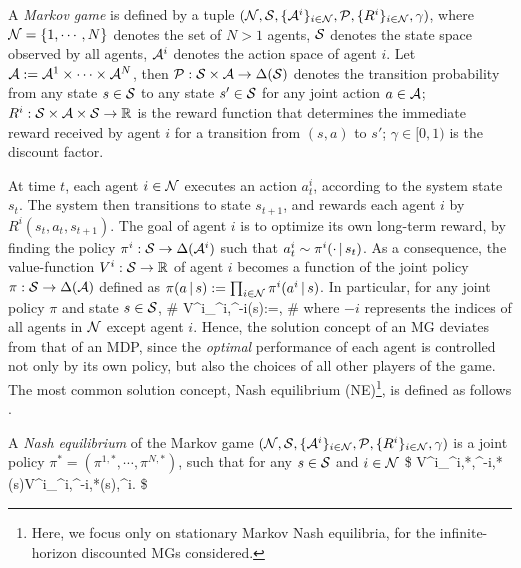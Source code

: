 \begin{definition}\label{def:Markov_Game}
	A \emph{Markov game}  is defined by a tuple $(\mathcal{N},{\mathcal{S}},\{\mathcal{A}^i\}_{i\in\mathcal{N}},\mathcal{P},\{R^i\}_{i\in\mathcal{N}},\gamma)$, where $\mathcal{N}=\{1,\cdots,N\}$ denotes the set of  $N> 1$ agents, 
	${\mathcal{S}}$ denotes the state space observed by all agents, $\mathcal{A}^i$ denotes the action space of agent $i$. Let $\mathcal{A}:=\mathcal{A}^1\times\cdots\times\mathcal{A}^N$, then 
	 $\mathcal{P}:{\mathcal{S}}\times\mathcal{A}\to\Delta({\mathcal{S}})$ denotes the transition probability from any state $s\in{\mathcal{S}}$ to any state $s'\in{\mathcal{S}}$ for any joint action $a\in\mathcal{A}$; $R^i:{\mathcal{S}}\times\mathcal{A}\times{\mathcal{S}}\to\mathbb{R}$ is the reward function that determines the immediate reward received by agent $i$ for a transition from $(s,a)$ to $s'$; $\gamma\in[0,1)$ is the discount factor. 
\end{definition}

At time $t$, each agent $i\in\mathcal{N}$ executes an action $a^i_t$, according to the system state $s_t$. The system then transitions to state $s_{t+1}$, and rewards each agent $i$ by $R^i(s_t,a_t,s_{t+1})$. The goal of agent $i$ is to optimize its own long-term reward, by finding the policy $\pi^i:{\mathcal{S}}\to\Delta(\mathcal{A}^i)$ such that $a^i_t\sim \pi^i(\cdot{\,|\,} s_t)$. 
As a consequence, the value-function $V^i:{\mathcal{S}}\to\mathbb{R}$ of agent $i$   becomes a function of the joint policy $\pi:{\mathcal{S}}\to\Delta(\mathcal{A})$ defined as $\pi(a{\,|\,} s):=\prod_{i\in\mathcal{N}}\pi^i(a^i{\,|\,} s)$. In particular, for any joint policy $\pi$ and state $s\in{\mathcal{S}}$,  
\#\label{eq:V_pi}
V^i_{\pi^i,\pi^{-i}}(s):=\EE\bigg[\sum_{t\geq 0}\gamma^t R^i(s_t,a_t,s_{t+1})\bigggiven a^i_t\sim \pi^i(\cdot\given s_t),s_0=s\bigg],
\#
where $-i$ represents the indices of all agents in $\mathcal{N}$ except agent $i$. 
Hence, the solution concept of an MG deviates  from that of an MDP, since the \emph{optimal} performance of each agent is controlled not only by its own  policy, but also the choices  of all other  players of the game. The most common solution concept, Nash equilibrium (NE)\footnote{Here, we focus only on stationary Markov Nash equilibria, for the infinite-horizon discounted MGs considered.}, is defined as follows \cite{basar1999dynamic,filar2012competitive}. 


\begin{definition}\label{def:NE}
	A \emph{Nash equilibrium} of the Markov game $(\mathcal{N},{\mathcal{S}},\{\mathcal{A}^i\}_{i\in\mathcal{N}},\mathcal{P},\{R^i\}_{i\in\mathcal{N}},\gamma)$ is a joint policy $\pi^*=(\pi^{1,*},\cdots,\pi^{N,*})$, such that for any $s\in{\mathcal{S}}$  and $i\in\mathcal{N}$
	\$
	V^i_{\pi^{i,*},\pi^{-i,*}}(s)\geq V^i_{\pi^i,\pi^{-i,*}}(s),\quad{}\pi^i.
	\$
\end{definition}

